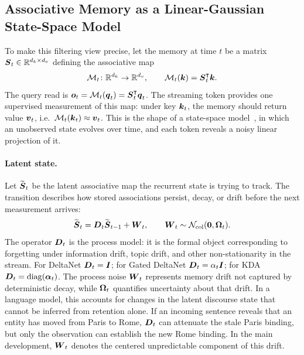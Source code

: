 \documentclass[11pt,letterpaper,logo]{yalearxiv}
\begin{document}
\subsection{Associative Memory as a Linear-Gaussian State-Space Model}
\label{sec:memory-formulation}

To make this filtering view precise, let the memory at time $t$ be a matrix
$\boldsymbol{S}_t\in\mathbb{R}^{d_k\times d_v}$ defining the associative map
\begin{equation}
  \mathcal M_t\colon \mathbb{R}^{d_k}\to\mathbb{R}^{d_v},\qquad \mathcal M_t(\boldsymbol{k})=\boldsymbol{S}_t^{\intercal}\boldsymbol{k} .
  \label{eq:assoc-map}
\end{equation}
The query read is $\boldsymbol{o}_t=\mathcal M_t(\boldsymbol{q}_t)=\boldsymbol{S}_t^{\intercal}\boldsymbol{q}_t$. The streaming token provides one
supervised measurement of this map: under key $\boldsymbol{k}_t$, the memory should return value $\boldsymbol{v}_t$,
i.e.\ $\mathcal M_t(\boldsymbol{k}_t)\approx \boldsymbol{v}_t$. This is the shape of a state-space
model~\citep{gu2023mamba}, in which an unobserved state evolves over time, and each token reveals a
noisy linear projection of it.

\paragraph{Latent state.}
Let $\widetilde{\boldsymbol{S}}_t$ be the latent associative map the recurrent state is trying to track. The
transition describes how stored associations persist, decay, or drift before the next
measurement arrives:
\begin{equation}
  \widetilde{\boldsymbol{S}}_t
  = \boldsymbol{D}_t \widetilde{\boldsymbol{S}}_{t-1} + \boldsymbol{W}_t,
  \qquad
  \boldsymbol{W}_t\sim\mathcal N_{\mathrm{col}}(\boldsymbol{0},\boldsymbol{\Omega}_t).
  \label{eq:mem-update-dynamics}
\end{equation}
The operator $\boldsymbol{D}_t$ is the process model: it is the formal object corresponding to forgetting
under information drift, topic drift, and other non-stationarity in the stream. For DeltaNet
$\boldsymbol{D}_t=\boldsymbol{I}$; for Gated DeltaNet $\boldsymbol{D}_t=\alpha_t \boldsymbol{I}$; for KDA
$\boldsymbol{D}_t=\operatorname{diag}(\boldsymbol{\alpha}_t)$. The process noise $\boldsymbol{W}_t$ represents memory drift not captured
by deterministic decay, while $\boldsymbol{\Omega}_t$ quantifies uncertainty about that drift. In a
language model, this accounts for changes in the latent discourse state that cannot be inferred
from retention alone. If an incoming sentence reveals that an entity has moved from Paris to
Rome, $\boldsymbol{D}_t$ can attenuate the stale Paris binding, but only the observation can establish the
new Rome binding.
In the main development, $\boldsymbol{W}_t$ denotes the centered unpredictable component of this drift.
\end{document}
